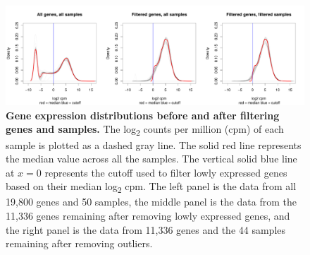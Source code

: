 \begin{figure}[ht]
\centering
\includegraphics[width=5in]{img/ch03/gene-exp-distribution.pdf}
\caption[Gene expression distributions before and after filtering genes and
samples.]{
\textbf{Gene expression distributions before and after filtering genes and
samples.} The log\textsubscript{2} counts per million (cpm) of each
sample is plotted as a dashed gray line. The solid red line represents
the median value across all the samples. The vertical solid blue line
at $x = 0$ represents the cutoff used to filter lowly expressed genes
based on their median log\textsubscript{2} cpm. The left panel is the
data from all 19,800 genes and 50 samples, the middle panel is the
data from the 11,336 genes remaining after removing lowly expressed
genes, and the right panel is the data from 11,336 genes and the 44
samples remaining after removing outliers.
}
\label{fig:gene}
\end{figure}

